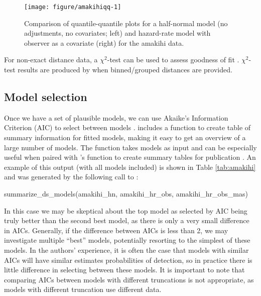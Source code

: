 \documentclass[article]{jss}\usepackage[]{graphicx}\usepackage[]{color}
\makeatletter
\def\maxwidth{ %
  \ifdim\Gin@nat@width>\linewidth
    \linewidth
  \else
    \Gin@nat@width
  \fi
}
\makeatother
\begin{document}
\begin{figure}
\begin{center}
\begin{Schunk}

\texttt{[image: figure/amakihiqq-1]} \end{Schunk}
\caption{Comparison of quantile-quantile plots for a half-normal model (no adjustments, no covariates; left) and hazard-rate model with observer as a covariate (right) for the amakihi data.}
\label{amakihi-qq}
\end{center}
\end{figure}

For non-exact distance data, a $\chi^2$-test can be used to assess goodness of fit \citep[see][Section 3.4.4]{Buckland:2001vm}. $\chi^2$-test results are produced by  when binned/grouped distances are provided.

\subsection{Model selection}

Once we have a set of plausible models, we can use Akaike's Information Criterion (AIC) to select between models \citep[see e.g.][]{burnham2003model}.  includes a function to create table of summary information for fitted models, making it easy to get an overview of a large number of models. The  function takes models as input and can be especially useful when paired with 's  function to create summary tables for publication \citep{knitr-pkg}. An example of this output (with all models included) is shown in Table \ref{tab:amakihi} and was generated by the following call to :

\begin{Code}
summarize_ds_models(amakihi_hn, amakihi_hr_obs, amakihi_hr_obs_mas)
\end{Code}

In this case we may be skeptical about the top model as selected by AIC being truly better than the second best model, as there is only a very small difference in AICs. Generally, if the difference between AICs is less than 2, we may investigate multiple ``best'' models, potentially resorting to the simplest of these models. In the authors' experience, it is often the case that models with similar AICs will have similar estimates probabilities of detection, so in practice there is little difference in selecting between these models. It is important to note that comparing AICs between models with different truncations is not appropriate, as models with different truncation use different data.
\end{document}
